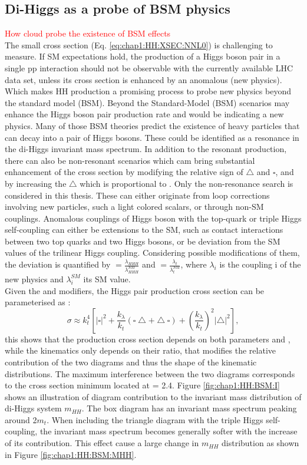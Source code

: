 \subsection{Di-Higgs as a probe of BSM physics}
\label{chap1:HH:BSM}
\textcolor{red}{How \kl cloud probe the existence of BSM effects} \\
The small cross section (Eq. \ref{eq:chap1:HH:XSEC:NNL0}) is challenging to measure. If SM expectations hold, the production of a Higgs boson pair in a single pp interaction should not be observable with the currently available LHC data set, unless its cross section is enhanced by an anomalous (new physics). Which makes HH production a promising process to probe new physics beyond the standard model (BSM). Beyond the Standard-Model (BSM) scenarios may enhance the Higgs boson pair production rate and would be indicating a new physics. Many of those BSM theories predict the existence of heavy particles that can decay into a pair of Higgs bosons. These could be identified as a resonance in the di-Higgs invariant mass spectrum. In addition to the resonant production, there can also be non-resonant scenarios which cam bring substantial enhancement of the cross section by modifying the relative sign of $\bigtriangleup$ and $\square$, and by increasing the $\bigtriangleup$ which is proportional to \kl. Only the non-resonance search is considered in this thesis. These can either originate from loop corrections involving new particles, such a light colored scalars, or through non-SM couplings. Anomalous couplings of Higgs boson with the top-quark or triple Higgs self-coupling can either be extensions to the SM, such as contact interactions between two top quarks and two Higgs bosons, or be deviation from the SM values of the trilinear Higgs coupling. Considering possible modifications of them, the deviation is quantified by \kl $ = \frac{\lambda_{HHH}}{\lambda_{HHH}^{SM}}$ and \kt $= \frac{\lambda_{t}}{\lambda_{t}^{SM}}$, where $\lambda_{i}$ is the coupling i of the new physics and $\lambda_{i}^{SM}$ its SM value. \\
Given the \kt and \kl modifiers, the Higgs pair production cross section can be parameterised as :
\begin{equation}
  \sigma \approx k_{t}^{4}\left[|\square|^{2}+\frac{k_{\lambda}}{k_{t}}(\square\bigtriangleup+\bigtriangleup \square)+\left(\frac{k_{\lambda}}{k_{t}}\right)^{2}|\bigtriangleup|^{2}\right], 
  \label{eq:chap1:HH:XSEC:Param}
\end{equation}
this shows that the production cross section depends on both parameters \kt and \kl, while the kinematics only depends on their ratio, that modifies the relative contribution of the two diagrams and thus the shape of the kinematic distributions. The maximum interference between the two diagrams corresponds to the cross section minimum located at \kl = 2.4\kt. Figure \ref{fig:chap1:HH:BSM:I} shows an illustration of diagram contribution to the invariant mass distribution of di-Higgs system $m_{HH}$. The box diagram has an invariant mass spectrum peaking around 2$m_t$. When including the triangle diagram with the triple Higgs self-coupling, the invariant mass spectrum becomes generally softer with the increase of its contribution. This effect cause a large change in $m_{HH}$ distribution as shown in Figure \ref{fig:chap1:HH:BSM:MHH}.
